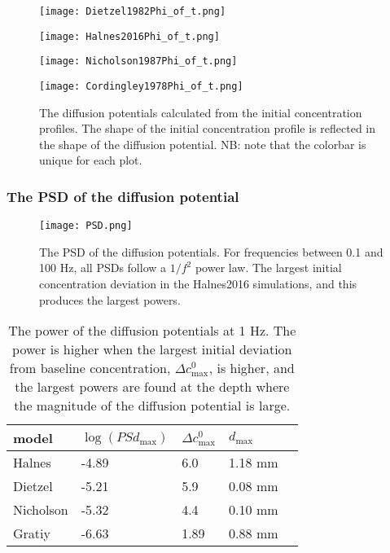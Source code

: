\documentclass{article}
\begin{document}
\begin{figure}[!tbp]
  \centering
  \begin{minipage}[b]{0.45\textwidth}
    \texttt{[image: Dietzel1982Phi\_of\_t.png]}
  \end{minipage}
  \hfill
  \begin{minipage}[b]{0.45\textwidth}
    \texttt{[image: Halnes2016Phi\_of\_t.png]}
  \end{minipage}
    \begin{minipage}[b]{0.45\textwidth}
    \texttt{[image: Nicholson1987Phi\_of\_t.png]}
  \end{minipage}
  \hfill
  \begin{minipage}[b]{0.45\textwidth}
    \texttt{[image: Cordingley1978Phi\_of\_t.png]}
  \end{minipage}
  \caption{The diffusion potentials calculated from the initial concentration profiles. The shape of the initial concentration profile is reflected in the shape of the diffusion potential. NB: note that the colorbar is unique for each plot.}
  \label{fig:contours}
\end{figure} 









\subsubsection{The PSD of the diffusion potential}\label{calculated PSDs}

\begin{figure}
  \texttt{[image: PSD.png]}
  \caption{The PSD of the diffusion potentials. For frequencies between 0.1 and 100 Hz, all PSDs follow a $1/f^2$ power law. The largest initial concentration deviation in the Halnes2016 simulations, and this produces the largest powers.}
  \label{fig:PSD}
\end{figure}


\begin{table}[h!]
  \centering
  \caption{The power of the diffusion potentials at 1 Hz. The power is higher when the largest initial deviation from baseline concentration, $\Delta c^0_{\text{max}}$, is higher, and the largest powers are found at the depth where the magnitude of the diffusion potential is large.}
  \label{tab:psd_magnitude}
  \begin{tabular}{l||l|l|l|l}
model & $\log (PSd_{\text{max}})$ & $\Delta c^0_{\text{max}}$ & $d_{\text{max}}$ \\
\hline
Halnes & -4.89 & 6.0  & 1.18 mm\\
Dietzel & -5.21 & 5.9 & 0.08 mm \\
Nicholson & -5.32 & 4.4 & 0.10 mm \\
Gratiy &-6.63 & 1.89 & 0.88 mm \\
 \end{tabular}
\end{table}
\end{document}
